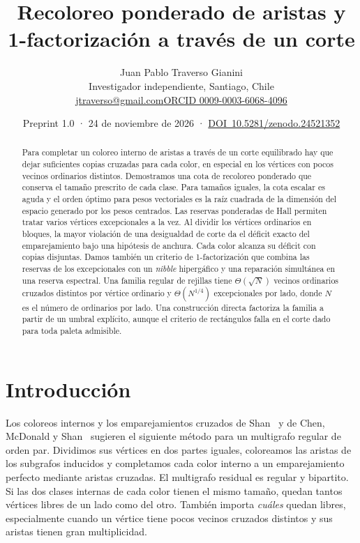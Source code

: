 \documentclass[11pt]{article}
\title{Recoloreo ponderado de aristas y 1-factorización a través de un corte}
\author{Juan Pablo Traverso Gianini\\\small Investigador independiente, Santiago, Chile\\\small\href{mailto:jtraverso@gmail.com}{jtraverso@gmail.com}\quad\href{https://orcid.org/0009-0003-6068-4096}{ORCID 0009-0003-6068-4096}}
\date{Preprint 1.0 · 24 de noviembre de 2026 · \mbox{\href{https://doi.org/10.5281/zenodo.24521352}{DOI 10.5281/zenodo.24521352}}}
\begin{document}
\maketitle

\begin{abstract}
Para completar un coloreo interno de aristas a través de un corte equilibrado hay que dejar suficientes copias cruzadas para cada color, en especial en los vértices con pocos vecinos ordinarios distintos. Demostramos una cota de recoloreo ponderado que conserva el tamaño prescrito de cada clase. Para tamaños iguales, la cota escalar es aguda y el orden óptimo para pesos vectoriales es la raíz cuadrada de la dimensión del espacio generado por los pesos centrados. Las reservas ponderadas de Hall permiten tratar varios vértices excepcionales a la vez. Al dividir los vértices ordinarios en bloques, la mayor violación de una desigualdad de corte da el déficit exacto del emparejamiento bajo una hipótesis de anchura. Cada color alcanza su déficit con copias disjuntas. Damos también un criterio de 1-factorización que combina las reservas de los excepcionales con un \emph{nibble} hipergáfico y una reparación simultánea en una reserva espectral. Una familia regular de rejillas tiene \(\Theta(\sqrt N)\) vecinos ordinarios cruzados distintos por vértice ordinario y \(\Theta(N^{1/4})\) excepcionales por lado, donde \(N\) es el número de ordinarios por lado. Una construcción directa factoriza la familia a partir de un umbral explícito, aunque el criterio de rectángulos falla en el corte dado para toda paleta admisible.
\end{abstract}

\section{Introducción}

Los coloreos internos y los emparejamientos cruzados de Shan~\cite{Shan} y de Chen, McDonald y Shan~\cite{CMS} sugieren el siguiente método para un multigrafo regular de orden par. Dividimos sus vértices en dos partes iguales, coloreamos las aristas de los subgrafos inducidos y completamos cada color interno a un emparejamiento perfecto mediante aristas cruzadas. El multigrafo residual es regular y bipartito. Si las dos clases internas de cada color tienen el mismo tamaño, quedan tantos vértices libres de un lado como del otro. También importa \emph{cuáles} quedan libres, especialmente cuando un vértice tiene pocos vecinos cruzados distintos y sus aristas tienen gran multiplicidad.
\end{document}
